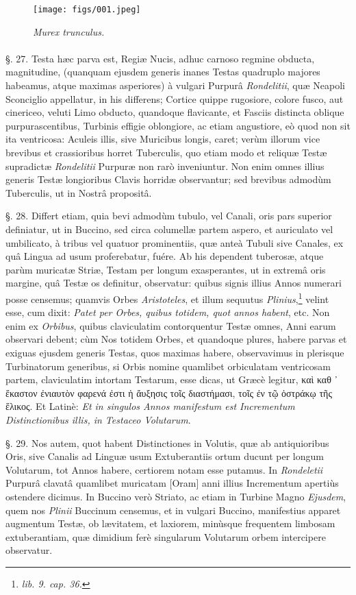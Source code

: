 \documentclass[a4paper, 11pt, oneside, polutonikogreek, german]{article}
\begin{document}
\begin{figure}[H]
\centering
\texttt{[image: figs/001.jpeg]}
\caption{\emph{Murex trunculus.}}
\end{figure}
\paragraph{}
§. 27. Testa hæc parva est, Regiæ Nucis, adhuc carnoso regmine obducta, magnitudine, (quanquam ejusdem generis inanes Testas quadruplo majores habeamus, atque maximas asperiores) à vulgari Purpurâ \emph{Rondelitii}, quæ Neapoli Sconciglio appellatur, in his differens; Cortice quippe rugosiore, colore fusco, aut cinericeo, veluti Limo obducto, quandoque flavicante, et Fasciis distincta oblique purpurascentibus, Turbinis effigie oblongiore, ac etiam angustiore, eò quod non sit ita ventricosa: Aculeis illis, sive Muricibus longis, caret; verùm illorum vice brevibus et crassioribus horret Tuberculis, quo etiam modo et reliquæ Testæ supradictæ \emph{Rondelitii} Purpuræ non rarò inveniuntur. Non enim omnes illius generis Testæ longioribus Clavis horridæ observantur; sed brevibus admodùm Tuberculis, ut in Nostrâ propositâ.

§. 28. Differt etiam, quia bevi admodùm tubulo, vel Canali, oris pars superior definiatur, ut in Buccino, sed circa columellæ partem aspero, et auriculato vel umbilicato, à tribus vel quatuor prominentiis, quæ anteà Tubuli sive Canales, ex quâ Lingua ad usum proferebatur, fuére. Ab his dependent tuberosæ, atque parùm muricatæ Striæ, Testam per longum exasperantes, ut in extremâ oris margine, quâ Testæ os definitur, observatur: quibus signis illius Annos numerari posse censemus; quamvis Orbes \emph{Aristoteles}, et illum sequutus \emph{Plinius},\footnote{\emph{lib. 9. cap. 36.}} velint esse, cum dixit: \emph{Patet per Orbes, quibus totidem, quot annos habent}, etc. Non enim ex \emph{Orbibus}, quibus claviculatim contorquentur Testæ omnes, Anni earum observari debent; cùm Nos totidem Orbes, et quandoque plures, habere parvas et exiguas ejusdem generis Testas, quos maximas habere, observavimus in plerisque Turbinatorum generibus, si Orbis nomine quamlibet orbiculatam ventricosam partem, claviculatim intortam Testarum, esse dicas, ut Græcè legitur, καὶ καθ ᾽ ἕκαστον ἐνιαυτὸν φαρενά ἐστι ἡ ἄυξησις τοῖς διαστήμασι, τοῖς ἐν τῷ ὀστράκῳ τῆς ἕλικος. Et Latinè: \emph{Et in singulos Annos manifestum est Incrementum Distinctionibus illis, in Testaceo Volutarum}.

§. 29. Nos autem, quot habent Distinctiones in Volutis, quæ ab antiquioribus Oris, sive Canalis ad Linguæ usum Extuberantiis ortum ducunt per longum Volutarum, tot Annos habere, certiorem notam esse putamus. In \emph{Rondeletii} Purpurâ clavatâ quamlibet muricatam [Oram] anni illius Incrementum apertiùs ostendere dicimus. In Buccino verò Striato, ac etiam in Turbine Magno \emph{Ejusdem}, quem nos \emph{Plinii} Buccinum censemus, et in vulgari Buccino, manifestius apparet augmentum Testæ, ob lævitatem, et laxiorem, minùsque frequentem limbosam extuberantiam, quæ dimidium ferè singularum Volutarum orbem intercipere observatur.
\end{document}
